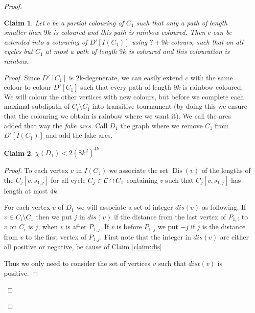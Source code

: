 \documentclass[utf8,10pt]{article}
\theoremstyle{plain}
\newtheorem{claim}{Claim}[theorem]
\theoremstyle{definition}
\theoremstyle{remark}
\DeclareMathOperator{\Dis}{Dis}
\begin{document}
\begin{proof}
\begin{claim}\label{IC}
Let $c$ be a partial colouring of $C_1$ such that only a path of length smaller than
$9k$ is coloured and this path is rainbow coloured. Then $c$ can be extended into
a colouring of $D'[I(C_1)]$ using $? + 9k$ colours, such that on all cycles but $C_1$ at most a path of length $9k$ is
coloured and this colouration is rainbow.
\end{claim}

\begin{proof}
Since $D'[C_1]$ is 2k-degenerate, we can easily extend $c$ with the same colour to colour $D'[C_1]$
such that every path of length $9k$ is rainbow coloured.
We will colour the other vertices with  new colours, but before we complete each maximal
subdipath of $C_i \setminus C_1$ into transitive tournament
(by doing this we ensure that the colouring we obtain is rainbow where we want it). We call the arcs added that way the \textit{fake arcs}.
Call $D_1$ the graph where we remove $C_1$ from $D'[I(C_1)]$ and add the fake arcs.

\begin{claim}
$\chi(D_1) <  2(8k^2)^{4k}$
\end{claim}

\begin{proof}
To each vertex $v$ in $I(C_1)$ we associate the set $\Dis(v)$ of the lengths of the $C_j[v,s_{1,j}]$ for all cycle $C_j\in {\cal C} \cap C_1$ containing $v$ such that $C_j[v,s_{1,j}]$ has length at most $4k$.


For each vertex $v$ of $D_1$ we will associate a set of integer $dis(v)$ as following.
If $v \in C_i \setminus C_1$ then we put $j$ in $dis(v)$ if the distance
from the last vertex of $P_{1,i}$ to $v$ on $C_i$ is $j$, when $v$ is after $P_{1,j}$.
If $v$ is before $P_{1,j}$ we put $-j$ if $j$ is the distance from $v$ to the first vertex of $P_{1,j}$.
First note that the integer in $dis(v)$ are either all positive or negative, be cause of Claim \ref{claim:dis}

Thus we only need to consider the set of vertices $v$ such that $dist(v)$ is positive.








\end{proof}
\end{proof}
\end{proof}
\end{document}
